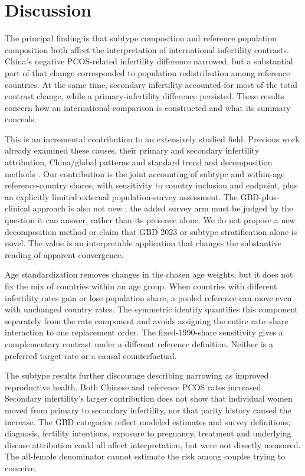 \documentclass[11pt,a4paper]{article}
\begin{document}
\section{Discussion}
The principal finding is that subtype composition and reference population composition both affect the interpretation of international infertility contrasts. China's negative PCOS-related infertility difference narrowed, but a substantial part of that change corresponded to population redistribution among reference countries. At the same time, secondary infertility accounted for most of the total contrast change, while a primary-infertility difference persisted. These results concern how an international comparison is constructed and what its summary conceals.

This is an incremental contribution to an extensively studied field. Previous work already examined these causes, their primary and secondary infertility attribution, China/global patterns and standard trend and decomposition methods \cite{xu,lu,wang,feng}. Our contribution is the joint accounting of subtype and within-age reference-country shares, with sensitivity to country inclusion and endpoint, plus an explicitly limited external population-survey assessment. The GBD-plus-clinical approach is also not new \cite{liu2026}; the added survey arm must be judged by the question it can answer, rather than its presence alone. We do not propose a new decomposition method or claim that GBD 2023 or subtype stratification alone is novel. The value is an interpretable application that changes the substantive reading of apparent convergence.

Age standardization removes changes in the chosen age weights, but it does not fix the mix of countries within an age group. When countries with different infertility rates gain or lose population share, a pooled reference can move even with unchanged country rates. The symmetric identity quantifies this component separately from the rate component and avoids assigning the entire rate--share interaction to one replacement order. The fixed-1990-share sensitivity gives a complementary contrast under a different reference definition. Neither is a preferred target rate or a causal counterfactual.

The subtype results further discourage describing narrowing as improved reproductive health. Both Chinese and reference PCOS rates increased. Secondary infertility's larger contribution does not show that individual women moved from primary to secondary infertility, nor that parity history caused the increase. The GBD categories reflect modeled estimates and survey definitions; diagnosis, fertility intentions, exposure to pregnancy, treatment and underlying disease attribution could all affect interpretation, but were not directly measured. The all-female denominator cannot estimate the risk among couples trying to conceive.
\end{document}
